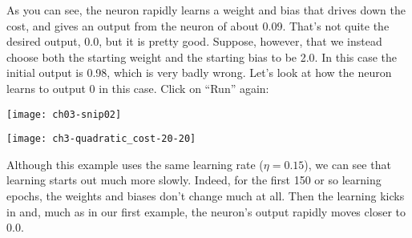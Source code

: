 As you can see, the neuron rapidly learns a weight and bias that drives down the cost, and gives an output from the neuron of about 0.09. That's not quite the desired output, 0.0, but it is pretty good. Suppose, however, that we instead choose both the starting weight and the starting bias to be 2.0. In this case the initial output is 0.98, which is very badly wrong. Let's look at how the neuron learns to output 0
in this case. Click on ``Run'' again:
\begin{marginfigure}
\texttt{[image: ch03-snip02]}
\end{marginfigure}
\begin{marginfigure}
\texttt{[image: ch3-quadratic\_cost-20-20]}
\end{marginfigure}


Although this example uses the same learning rate ($\eta=0.15$), we can see that learning starts out much more slowly. Indeed, for the first 150 or so learning epochs, the weights and biases don't change much at all. Then the learning kicks in and, much as in our first example, the neuron's output rapidly moves closer to 0.0.

